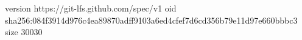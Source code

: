 version https://git-lfs.github.com/spec/v1
oid sha256:084f3914d976c4ea89870adff9103a6ed4cfef7d6cd356b79e11d97e660bbbc3
size 30030

